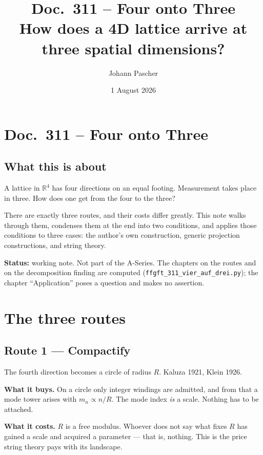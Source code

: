 \documentclass[11pt]{report}
\title{Doc.~311 -- Four onto Three\\
\large How does a 4D lattice arrive at three spatial dimensions?}
\author{Johann Pascher}
\date{1 August 2026}
\begin{document}
\maketitle
\tableofcontents

\chapter*{Doc.~311 -- Four onto Three}

\section*{What this is about}

A lattice in $\mathbb{R}^4$ has four directions on an equal footing.
Measurement takes place in three. How does one get from the four to the
three?

There are exactly three routes, and their costs differ greatly. This
note walks through them, condenses them at the end into two conditions,
and applies those conditions to three cases: the author's own
construction, generic projection constructions, and string theory.

\medskip
\noindent\textbf{Status:} working note. Not part of the A-Series. The
chapters on the routes and on the decomposition finding are computed
(\texttt{ffgft\_311\_vier\_auf\_drei.py}); the chapter
\enquote{Application} poses a question and makes no assertion.

\chapter{The three routes}

\section{Route 1 --- Compactify}

The fourth direction becomes a circle of radius $R$. Kaluza 1921,
Klein 1926.

\textbf{What it buys.} On a circle only integer windings are admitted,
and from that a mode tower arises with $m_n \propto n/R$. The mode
index \emph{is} a scale. Nothing has to be attached.

\textbf{What it costs.} $R$ is a free modulus. Whoever does not say
what fixes $R$ has gained a scale and acquired a parameter --- that is,
nothing. This is the price string theory pays with its landscape.
\end{document}

